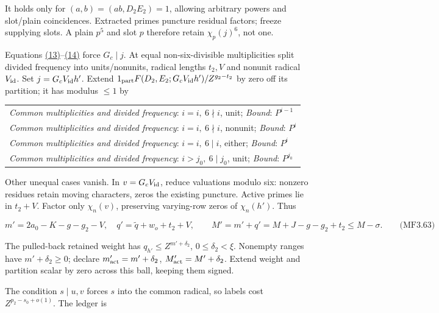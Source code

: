 It holds only for \((a,b)=(ab,D_2E_2)=1\), allowing arbitrary powers and slot/plain coincidences. Extracted primes puncture residual factors; freeze supplying slots. A plain \(p^5\) and slot \(p\) therefore retain \(\chi_p(j)^6\), not one.

Equations \protect\hyperlink{cf:eq:A.17}{(13)}--\protect\hyperlink{cf:eq:A.18}{(14)} force \(G_c\mid j\). At equal non-six-divisible multiplicities split divided frequency into units/nonunits, radical lengths \(t_2,V\) and nonunit radical \(V_{\rm id}\). Set \(j=G_cV_{\rm id}h'\). Extend \(1_{\rm part}F(D_2,E_2;G_cV_{\rm id}h')/Z^{g_2-t_2}\) by zero off its partition; it has modulus \(\le1\) by

\begingroup\small
\begin{longtable}{@{}p{\linewidth}@{}}
\toprule
\endhead
\bottomrule
\endlastfoot
\textit{Common multiplicities and divided frequency}: \(i=i,\ 6\nmid i\), unit; \enspace \textit{Bound}: \(P^{i-1}\) \\
\addlinespace[3pt]
\textit{Common multiplicities and divided frequency}: \(i=i,\ 6\nmid i\), nonunit; \enspace \textit{Bound}: \(P^i\) \\
\addlinespace[3pt]
\textit{Common multiplicities and divided frequency}: \(i=i,\ 6\mid i\), either; \enspace \textit{Bound}: \(P^i\) \\
\addlinespace[3pt]
\textit{Common multiplicities and divided frequency}: \(i>j_0,\ 6\mid j_0\), unit; \enspace \textit{Bound}: \(P^{j_0}\) \\
\end{longtable}
\endgroup

Other unequal cases vanish. In \(v=G_cV_{\rm id}\), reduce valuations modulo six: nonzero residues retain moving characters, zeros the existing puncture. Active primes lie in \(t_2+V\). Factor only \(\chi_n(v)\), preserving varying-row zeros of \(\chi_n(h')\). Thus

\hypertarget{mf:eq:B3.63}{}

\label{mf:eq:B3.63}

\[
m'=2a_0-K-g-g_2-V,\quad q'=\widetilde q+w_o+t_2+V,
\qquad M'=m'+q'=M+J-g-g_2+t_2\le M-\sigma.
\qquad\text{(MF3.63)}
\]

The pulled-back retained weight has \(q_{h'}\le Z^{m'+\delta_2}\), \(0\le\delta_2<\xi\). Nonempty ranges have \(m'+\delta_2\ge0\); declare \(m'_{\rm act}=m'+\delta_2\), \(M'_{\rm act}=M'+\delta_2\). Extend weight and partition scalar by zero across this ball, keeping them signed.

The condition \(s\mid u,v\) forces \(s\) into the common radical, so labels cost \(Z^{p_2-s_0+o(1)}\). The ledger is

